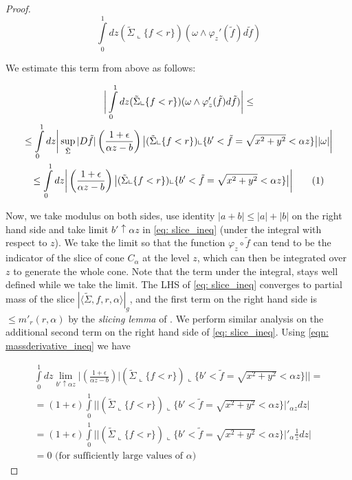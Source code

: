 \documentclass{amsart}
\newcommand\numberthis{\addtocounter{equation}{1}\tag{\theequation}}
\newcommand{\ts}{\tilde{\Sigma}}
\theoremstyle{named}
\begin{document}
\begin{proof}
    \begin{equation} \nonumber
        \int\limits_{0}^{1} dz  (\ts \llcorner \{ f < r \})( \omega \wedge \varphi_{z}'(\tilde{f})d\tilde{f})
    \end{equation}

    We estimate this term from above as follows:
    
    \begin{gather*} 
         \bigg| \int\limits_{0}^{1} dz (\ts \llcorner \{ f < r \}) (\omega \wedge \varphi_{z}'(\tilde{f})d\tilde{f}) \bigg| \leq \\ 
         \leq \int\limits_{0}^{1} dz \bigg | \sup\limits_{\ts} |D\tilde{f}| \left( \frac{1 + \epsilon}{\alpha z - b} \right) \big| (\ts \llcorner \{ f < r \}) \llcorner \{ b' < \tilde{f} = \sqrt{x^2 + y^2} < \alpha z \} \big| |\omega| \bigg | \\ 
         \leq \int\limits_{0}^{1} dz \bigg| \left( \frac{1+\epsilon}{\alpha z - b} \right) \big| (\ts \llcorner \{ f < r \}) \llcorner \{ b' < \tilde{f} = \sqrt{x^2 + y^2} < \alpha z \} \big| \bigg| \numberthis \label{eqn: massderivative_ineq}
    \end{gather*}
    
    Now, we take modulus on both sides, use identity $|a + b| \leq |a| + |b|$ on the right hand side and take limit $b' \uparrow \alpha z$ in \ref{eq: slice_ineq} (under the integral with respect to $z$). We take the limit so that the function $\varphi_z \circ \tilde{f}$ can tend to be the indicator of the slice of cone $C_{\alpha}$ at the level $z$, which can then be integrated over $z$ to generate the whole cone. Note that the term under the integral, stays well defined while we take the limit. The LHS of \ref{eq: slice_ineq} converges to partial mass of the slice $|\langle \ts, f, r, \alpha \rangle|_g$, and the first term on the right hand side is $ \leq m'_{r}(r,\alpha)$ by the \textit{slicing lemma} of \cite{simon}. We perform similar analysis on the additional second term on the right hand side of \ref{eq: slice_ineq}. Using \ref{eqn: massderivative_ineq} we have

    \begin{gather*}
        \int\limits_{0}^{1} dz \lim\limits_{b' \uparrow \alpha z} \bigg| \left( \frac{1+\epsilon}{\alpha z - b} \right) \big| (\ts \llcorner \{ f < r \}) \llcorner \{ b' < \tilde{f} = \sqrt{x^2 + y^2} < \alpha z \} \big| \bigg | = \\ 
        = (1+\epsilon) \int\limits_{0}^{1} \bigg| \big| (\ts \llcorner \{ f < r \}) \llcorner \{ b' < \tilde{f} = \sqrt{x^2 + y^2} < \alpha z \} \big|'_{\alpha z} dz \bigg| \\ 
        = (1+\epsilon) \int\limits_{0}^{1} \bigg| \big| (\ts \llcorner \{ f < r \}) \llcorner \{ b' < \tilde{f} = \sqrt{x^2 + y^2} < \alpha z \} \big|'_{\alpha} \frac{1}{z} dz \bigg| \\ 
        = 0 \text{ (for sufficiently large values of $\alpha$)}
    \end{gather*}
    

\end{proof}
\end{document}
